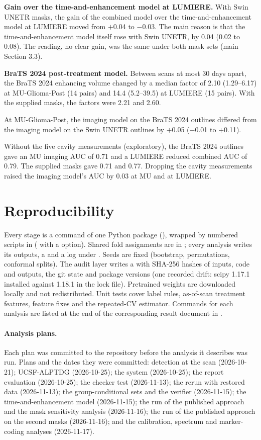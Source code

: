 \documentclass[11pt,a4paper]{article}
\begin{document}
\textbf{Gain over the time-and-enhancement model at LUMIERE.} With Swin UNETR masks, the gain of the combined model
over the time-and-enhancement model at LUMIERE moved from $+$0.04 to $-$0.03. The main reason is that the
time-and-enhancement model itself rose with Swin UNETR, by 0.04 (0.02 to 0.08). The reading, no clear gain, was the
same under both mask sets (main Section 3.3).

\textbf{BraTS 2024 post-treatment model.} Between scans at most 30 days apart, the BraTS 2024 enhancing volume
changed by a median factor of 2.10 (1.29--6.17) at MU-Glioma-Post (14 pairs) and 14.4 (5.2--39.5) at LUMIERE (15
pairs). With the supplied masks, the factors were 2.21 and 2.60.

At MU-Glioma-Post, the imaging model on the BraTS 2024 outlines differed from the imaging model on the Swin UNETR
outlines by $+$0.05 ($-$0.01 to $+$0.11).

Without the five cavity measurements (exploratory), the BraTS 2024 outlines gave an MU imaging AUC of 0.71 and a
LUMIERE reduced combined AUC of 0.79. The supplied masks gave 0.71 and 0.77. Dropping the cavity measurements raised
the imaging model's AUC by 0.03 at MU and at LUMIERE.

\FloatBarrier
\section{Reproducibility}\label{sec:S16}

Every stage is a command of one Python package (), wrapped by numbered scripts
in  ( with a  option). Shared fold
assignments are in
; every analysis writes its outputs, a
 and a log under
. Seeds are fixed (bootstrap, permutations, conformal splits). The audit layer writes a
 with SHA-256 hashes of inputs, code and outputs, the git state and package versions (one
recorded drift: scipy 1.17.1 installed against 1.18.1 in the lock file). Pretrained weights are downloaded
locally and not redistributed. Unit tests cover label rules, as-of-scan treatment features, feature fixes and
the repeated-CV estimator. Commands for each analysis are listed at the end of the corresponding result
document in . 

\paragraph{Analysis plans.} Each plan was committed to the repository before the analysis it describes was run.
Plans and the dates they were committed: detection at the scan (2026-10-21); UCSF-ALPTDG (2026-10-25); the system
(2026-10-25); the report evaluation (2026-10-25); the checker test (2026-11-13); the rerun with restored data
(2026-11-13); the group-conditional sets and the verifier (2026-11-15); the time-and-enhancement model
(2026-11-15); the run of the published approach and the mask sensitivity analysis (2026-11-16); the run of the
published approach on the second masks (2026-11-16); and the calibration, spectrum and marker-coding analyses
(2026-11-17).
\end{document}
